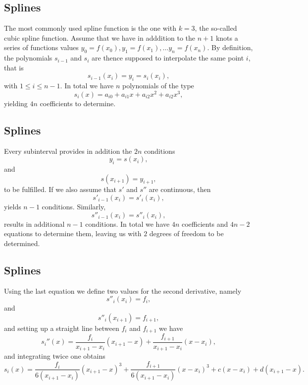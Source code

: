 \documentclass[%
twoside,                 %
final,                   %
10pt]{article}
\begin{document}
{{{{{{{%
\subsection{Splines}
\begin{block}{}
The most commonly used spline function is the one with $k=3$, the so-called
cubic spline function. 
Assume that we have in adddition to the $n+1$ knots a series of
functions values $y_0=f(x_0), y_1=f(x_1), \dots y_n=f(x_n)$.
By definition, the polynomials $s_{i-1}$ and $s_i$ 
are thence supposed to interpolate the same point $i$, that is
\[
    s_{i-1}(x_i)= y_i = s_i(x_i),
\]
with $1 \le i \le n-1$. In total we have $n$ polynomials of the 
type
\[
    s_i(x)=a_{i0}+a_{i1}x+a_{i2}x^2+a_{i2}x^3,
\]
yielding $4n$ coefficients to determine.
\end{block}


\subsection{Splines}
\begin{block}{}
Every subinterval provides in addition the $2n$ conditions 
\[
    y_i = s(x_i),
\]
and 
\[
    s(x_{i+1})= y_{i+1},
\]
to be fulfilled. If we also assume that $s'$ and $s''$ are continuous,
then
\[
       s'_{i-1}(x_i)= s'_i(x_i),
\]
yields $n-1$ conditions. Similarly,
\[
       s''_{i-1}(x_i)= s''_i(x_i),
\]
results in additional $n-1$ conditions. In total we have $4n$ coefficients
and $4n-2$ equations to determine them, leaving us with $2$ degrees of 
freedom to be determined. 
\end{block}

\subsection{Splines}
\begin{block}{}
Using the last equation we define two values for the second derivative, namely
\[
       s''_{i}(x_i)= f_i,
\]
and
\[
       s''_{i}(x_{i+1})= f_{i+1},
\]
and setting up a straight line between $f_i$ and $f_{i+1}$ we have
\[
   s_i''(x) = \frac{f_i}{x_{i+1}-x_i}(x_{i+1}-x)+
               \frac{f_{i+1}}{x_{i+1}-x_i}(x-x_i),
\]
and integrating twice one obtains
\[
   s_i(x) = \frac{f_i}{6(x_{i+1}-x_i)}(x_{i+1}-x)^3+
               \frac{f_{i+1}}{6(x_{i+1}-x_i)}(x-x_i)^3
             +c(x-x_i)+d(x_{i+1}-x).
\]
\end{block}



}}}}}}}
\end{document}

